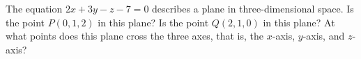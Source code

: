 The equation $2x + 3y - z - 7 = 0$ describes a plane in three-dimensional space.  Is the point $P(0,1,2)$ in this plane?  Is the point $Q(2,1,0)$ in this plane?  At what points does this plane cross the three axes, that is, the $x$-axis, $y$-axis, and $z$-axis?